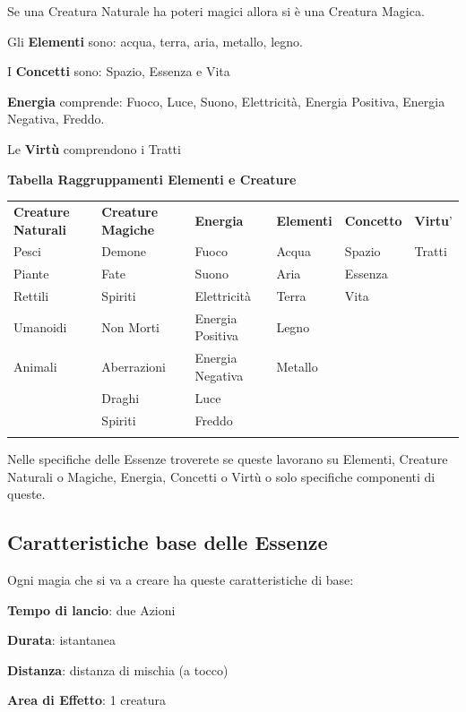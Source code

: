 \documentclass[a4paper,11pt,twoside,openany]{book}
\begin{document}
Se una Creatura Naturale ha poteri magici allora si è una Creatura Magica.

Gli \textbf{Elementi} sono: acqua, terra, aria, metallo, legno. 

I \textbf{Concetti} sono: Spazio, Essenza e Vita

\textbf{Energia} comprende: Fuoco, Luce, Suono, Elettricità, Energia Positiva, Energia Negativa, Freddo.

Le \textbf{Virtù} comprendono i Tratti

\bigskip

\textbf{Tabella Raggruppamenti Elementi e Creature}

\medskip

\begin{tabular}{llllll}
\toprule
\textbf{Creature Naturali} & \textbf{Creature Magiche} & \textbf{Energia} & \textbf{Elementi} & \textbf{Concetto} & \textbf{Virtu}'\tabularnewline
Pesci & Demone & Fuoco & Acqua & Spazio & Tratti\tabularnewline
Piante & Fate & Suono & Aria & Essenza & \tabularnewline
Rettili & Spiriti & Elettricità & Terra & Vita & \tabularnewline
Umanoidi & Non Morti & Energia Positiva & Legno & & \tabularnewline
Animali & Aberrazioni & Energia Negativa & Metallo & & \tabularnewline
 & Draghi & Luce & & & \tabularnewline
 & Spiriti & Freddo & & & \tabularnewline
 & & & & & \tabularnewline
\end{tabular}

\bigskip

Nelle specifiche delle Essenze troverete se queste lavorano su Elementi, Creature Naturali o Magiche, Energia, Concetti o Virtù o solo specifiche componenti di queste.

\subsection{Caratteristiche base delle Essenze}

\label{caratteristiche-base-delle-essenze}

Ogni magia che si va a creare ha queste caratteristiche di base:

\smallskip

\textbf{Tempo di lancio}: due Azioni

\textbf{Durata}: istantanea

\textbf{Distanza}: distanza di mischia (a tocco)

\textbf{Area di Effetto}: 1 creatura 
\end{document}
